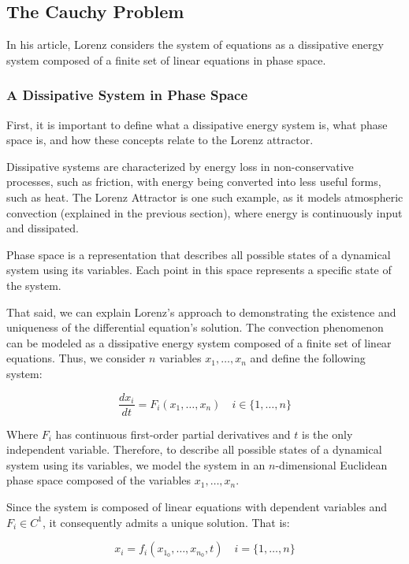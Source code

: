 \documentclass[12pt, a4paper]{article}
\begin{document}
\subsection{The Cauchy Problem}

In his article, Lorenz considers the system of equations as a dissipative energy system composed of a finite set of linear equations in phase space.

\subsubsection{A Dissipative System in Phase Space}

First, it is important to define what a dissipative energy system is, what phase space is, and how these concepts relate to the Lorenz attractor.

Dissipative systems are characterized by energy loss in non-conservative processes, such as friction, with energy being converted into less useful forms, such as heat. The Lorenz Attractor is one such example, as it models atmospheric convection (explained in the previous section), where energy is continuously input and dissipated.

Phase space is a representation that describes all possible states of a dynamical system using its variables. Each point in this space represents a specific state of the system.

That said, we can explain Lorenz's approach to demonstrating the existence and uniqueness of the differential equation's solution. The convection phenomenon can be modeled as a dissipative energy system composed of a finite set of linear equations. Thus, we consider $n$ variables $x_1, \ldots, x_n$ and define the following system:

\begin{equation}
	\frac{dx_i}{dt} = F_i\left(x_1, \ldots, x_n\right) \quad i \in \{1, \ldots, n\}
\end{equation}

Where $F_i$ has continuous first-order partial derivatives and $t$ is the only independent variable. Therefore, to describe all possible states of a dynamical system using its variables, we model the system in an $n$-dimensional Euclidean phase space composed of the variables $x_1, \ldots, x_n$.

Since the system is composed of linear equations with dependent variables and $F_i \in C^1$, it consequently admits a unique solution. That is:

\begin{equation}
	x_i = f_i(x_{1_0}, \ldots, x_{n_0}, t) \quad i = \{1, \ldots, n\}
\end{equation}
\end{document}
